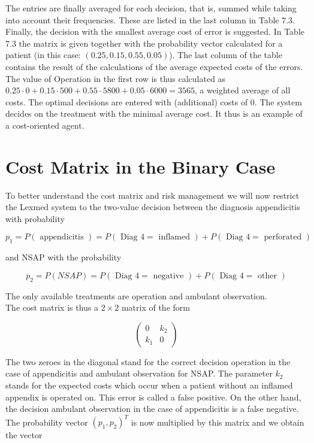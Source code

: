 \documentclass[10pt]{book}
\begin{document}
The entries are finally averaged for each decision, that is, summed while taking into account their frequencies. These are listed in the last column in Table 7.3. Finally, the decision with the smallest average cost of error is suggested. In Table 7.3 the matrix is given together with the probability vector calculated for a patient (in this case: $(0.25,0.15,0.55,0.05)$). The last column of the table contains the result of the calculations of the average expected costs of the errors. The value of Operation in the first row is thus calculated as $0.25 \cdot 0+0.15 \cdot 500+0.55 \cdot 5800+0.05 \cdot 6000=3565$, a weighted average of all costs. The optimal decisions are entered with (additional) costs of 0. The system decides on the treatment with the minimal average cost. It thus is an example of a cost-oriented agent.

\section{Cost Matrix in the Binary Case}
To better understand the cost matrix and risk management we will now restrict the Lexmed system to the two-value decision between the diagnosis appendicitis with probability

$$
p_{1}=P(\text { appendicitis })=P(\text { Diag } 4=\text { inflamed })+P(\text { Diag } 4=\text { perforated })
$$

and NSAP with the probability

$$
p_{2}=P(N S A P)=P(\text { Diag } 4=\text { negative })+P(\text { Diag } 4=\text { other })
$$

The only available treatments are operation and ambulant observation.\\
The cost matrix is thus a $2 \times 2$ matrix of the form

$$
\left(\begin{array}{cc}
0 & k_{2} \\
k_{1} & 0
\end{array}\right)
$$

The two zeroes in the diagonal stand for the correct decision operation in the case of appendicitis and ambulant observation for NSAP. The parameter $k_{2}$ stands for the expected costs which occur when a patient without an inflamed appendix is operated on. This error is called a false positive. On the other hand, the decision ambulant observation in the case of appendicitis is a false negative. The probability vector $\left(p_{1}, p_{2}\right)^{T}$ is now multiplied by this matrix and we obtain the vector
\end{document}
